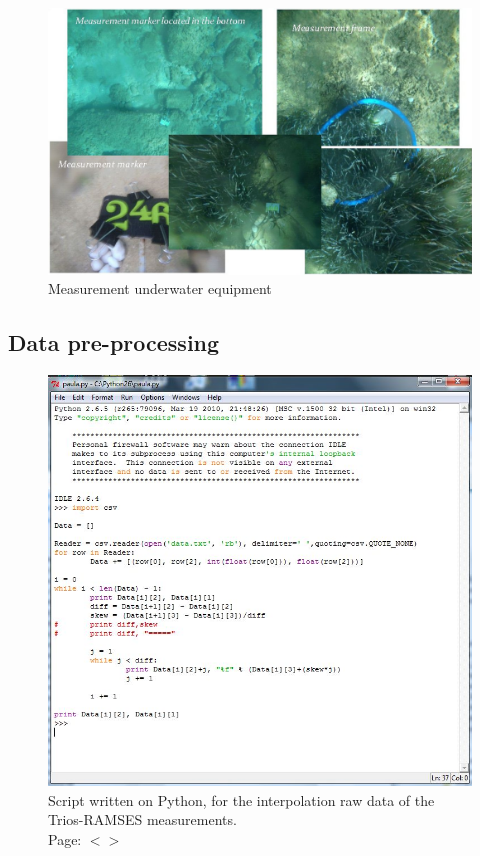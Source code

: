 \documentclass[11pt]{article}
\begin{document}
\begin{appendices}
\begin{figure}[H]
	\begin{center}
		\includegraphics[scale=0.3]{Fig-3-16.jpg}
		\caption{Measurement underwater equipment}\label{fig:A.7}		
	\end{center}
\end{figure}
\pagebreak

\subsection{Data pre-processing}

\begin{figure}[H]
	\centering
	\includegraphics[scale=0.55]{Fig-24.jpg}
	\caption{Script written on Python, for the interpolation raw data of the Trios-RAMSES measurements. \\ Page: $<$\pageref{page-28}$>$}
	\label{fig:A.8}
\end{figure}
\pagebreak


\end{appendices}
\end{document}
